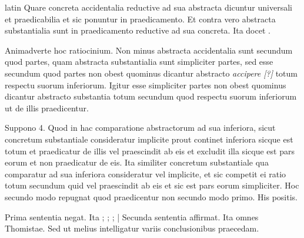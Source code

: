 \begin{otherlanguage*}{latin}
\pstart
  Quare concreta accidentalia reductive ad sua abstracta dicuntur universali et praedicabilia et sic ponuntur in praedicamento. Et contra vero abstracta substantialia sunt in praedicamento reductive ad sua concreta. Ita docet . 
\pend

\pstart
  Animadverte hoc ratiocinium. Non minus abstracta accidentalia sunt secundum quod partes, quam abstracta substantialia sunt simpliciter partes, sed esse secundum quod partes non obest quominus dicantur abstracto \emph{accipere [?]} totum respectu suorum inferiorum. Igitur esse simpliciter partes non obest quominus dicantur abstracto substantia totum secundum quod respectu suorum inferiorum ut de illis praedicentur. 
\pend

\pstart
  Suppono 4. Quod in hac comparatione abstractorum ad sua inferiora, sicut concretum substantiale consideratur implicite prout continet inferiora sicque est totum et praedicatur de illis vel praescindit ab eis et excludit illa sicque est pars eorum et non praedicatur de eis. Ita similiter concretum substantiale qua comparatur ad sua inferiora consideratur vel implicite, et sic competit ei ratio totum secundum quid vel praescindit ab eis et sic est pars eorum simpliciter. Hoc secundo modo repugnat quod praedicentur non secundo modo primo. His positis. 
\pend

\pstart
  Prima sententia negat. Ita ; ; ;  \textnormal{|}   Secunda sententia affirmat. Ita omnes Thomistae. Sed ut melius intelligatur variis conclusionibus praecedam. 
\pend


\end{otherlanguage*}
